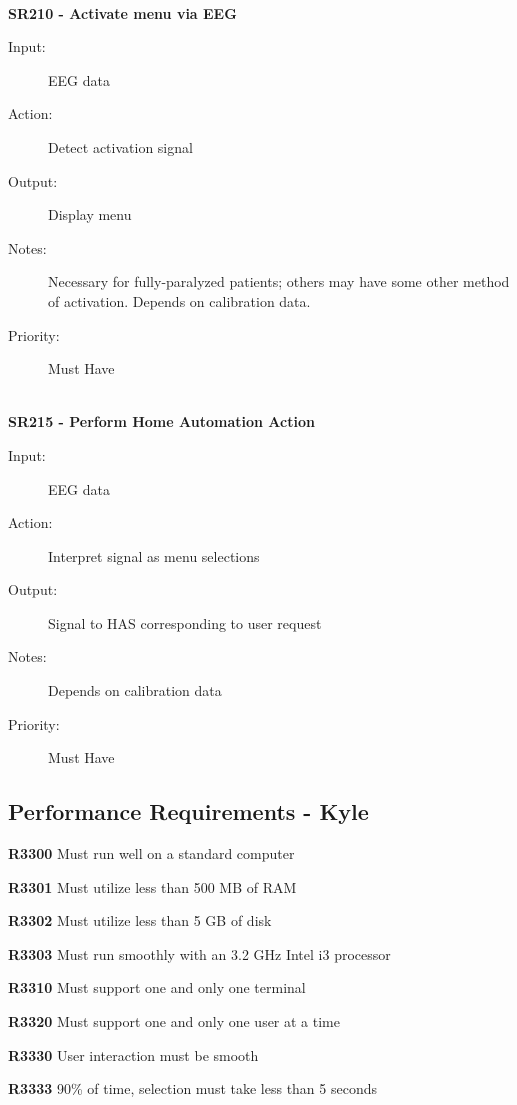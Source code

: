 \documentclass{article}
\begin{document}
\hfill \\

\textbf{SR210 - Activate menu via EEG}
\begin{description}
    \item[Input:] EEG data
    \item[Action:] Detect activation signal
    \item[Output:] Display menu
    \item[Notes:] Necessary for fully-paralyzed patients; others may have some
        other method of activation. Depends on calibration data.
    \item[Priority:] Must Have
\end{description}

\hfill \\

\textbf{SR215 - Perform Home Automation Action}
\begin{description}
    \item[Input:] EEG data
    \item[Action:] Interpret signal as menu selections
    \item[Output:] Signal to HAS corresponding to user request
    \item[Notes:] Depends on calibration data
    \item[Priority:] Must Have
\end{description}
\subsection{Performance Requirements - Kyle}
\textbf{R3300} Must run well on a standard computer

\setlength\parindent{24pt}
\textbf{R3301} Must utilize less than 500 MB of RAM

\textbf{R3302} Must utilize less than 5 GB of disk

\textbf{R3303} Must run smoothly with an 3.2 GHz Intel i3 processor

\setlength\parindent{0pt}

\textbf{R3310} Must support one and only one terminal

\textbf{R3320} Must support one and only one user at a time

\textbf{R3330} User interaction must be smooth
\setlength\parindent{24pt} 

\textbf{R3333} 90\% of time, selection must take less than 5 seconds
\end{document}
